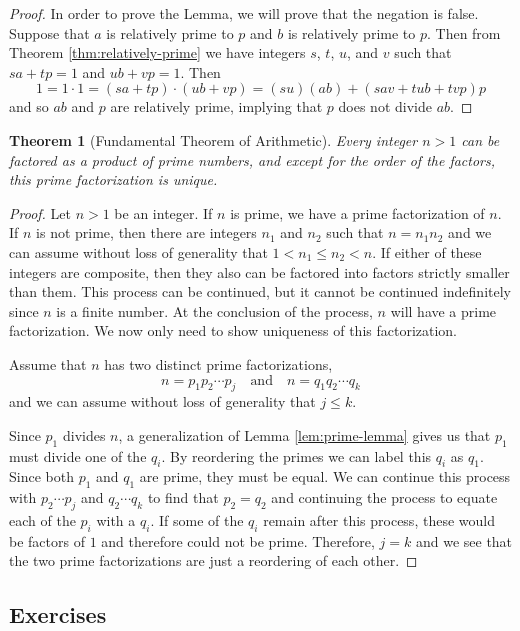 \documentclass[
]{book}
\newtheorem{theorem}{Theorem}[chapter]
\theoremstyle{definition}
\theoremstyle{definition}
\theoremstyle{definition}
\theoremstyle{definition}
\theoremstyle{remark}
\begin{document}
\begin{proof}
In order to prove the Lemma, we will prove that the negation is false. Suppose that \(a\) is relatively prime to \(p\) and \(b\) is relatively prime to \(p\). Then from Theorem \ref{thm:relatively-prime} we have integers \(s\), \(t\), \(u\), and \(v\) such that \(sa+tp=1\) and \(ub+vp=1\). Then
\[1= 1 \cdot 1 = (sa+tp)\cdot (ub+vp) = (su)(ab)+(sav+tub+tvp)p\] and so \(ab\) and \(p\) are relatively prime, implying that \(p\) does not divide \(ab\).
\end{proof}

\begin{theorem}[Fundamental Theorem of Arithmetic]
Every integer \(n>1\) can be factored as a product of prime numbers, and except for the order of the factors, this prime factorization is unique.
\end{theorem}

\begin{proof}
Let \(n>1\) be an integer. If \(n\) is prime, we have a prime factorization of \(n\). If \(n\) is not prime, then there are integers \(n_1\) and \(n_2\) such that \(n=n_1 n_2\) and we can assume without loss of generality that \(1<n_1\leq n_2<n\). If either of these integers are composite, then they also can be factored into factors strictly smaller than them. This process can be continued, but it cannot be continued indefinitely since \(n\) is a finite number. At the conclusion of the process, \(n\) will have a prime factorization. We now only need to show uniqueness of this factorization.

Assume that \(n\) has two distinct prime factorizations,
\[n=p_1 p_2 \cdots p_j \quad \mbox{and} \quad n=q_1 q_2 \cdots q_k\] and we can assume without loss of generality that \(j\leq k\).

Since \(p_1\) divides \(n\), a generalization of Lemma \ref{lem:prime-lemma} gives us that \(p_1\) must divide one of the \(q_i\). By reordering the primes we can label this \(q_i\) as \(q_1\). Since both \(p_1\) and \(q_1\) are prime, they must be equal. We can continue this process with \(p_2 \cdots p_j\) and \(q_2\cdots q_k\) to find that \(p_2=q_2\) and continuing the process to equate each of the \(p_i\) with a \(q_i\). If some of the \(q_i\) remain after this process, these would be factors of \(1\) and therefore could not be prime. Therefore, \(j=k\) and we see that the two prime factorizations are just a reordering of each other.
\end{proof}

\hypertarget{exercises-23}{%
\subsection{Exercises}\label{exercises-23}}
\end{document}
